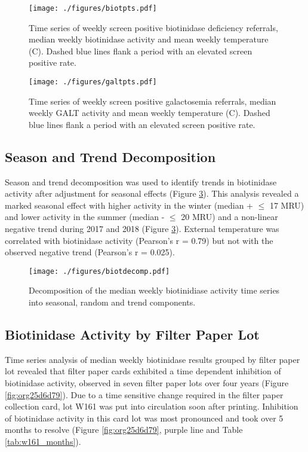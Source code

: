 \documentclass[review]{elsarticle}
\begin{document}
\begin{figure}[htbp]
\centering
\texttt{[image: ./figures/biotpts.pdf]}
\caption{\label{fig:org66b7778}Time series of weekly screen positive biotinidase deficiency referrals, median weekly biotinidase activity and mean weekly temperature (\degree{}C). Dashed blue lines flank a period with an elevated screen positive rate.}
\end{figure}

\begin{figure}[htbp]
\centering
\texttt{[image: ./figures/galtpts.pdf]}
\caption{\label{fig:orgc7ba5f8}Time series of weekly screen positive galactosemia referrals, median weekly GALT activity and mean weekly temperature (\degree{}C).  Dashed blue lines flank a period with an elevated screen positive rate.}
\end{figure}

\clearpage

\subsection*{Season and Trend Decomposition}
\label{sec:org340db58}
Season and trend decomposition was used to identify trends in
biotinidase activity after adjustment for seasonal effects (Figure
\ref{fig:orgc3a63e4}). This analysis revealed a marked seasonal effect with
higher activity in the winter (median + \(\le\) 17 MRU) and lower activity
in the summer (median - \(\le\) 20 MRU) and a non-linear negative trend
during 2017 and 2018 (Figure \ref{fig:orgc3a63e4}). External temperature was
correlated with biotinidase activity (Pearson's r = 0.79) but not with
the observed negative trend (Pearson's r = 0.025).

\begin{figure}[htbp]
\centering
\texttt{[image: ./figures/biotdecomp.pdf]}
\caption{\label{fig:orgc3a63e4}Decomposition of the median weekly biotinidiase activity time series into seasonal, random and trend components.}
\end{figure}

\clearpage

\subsection*{Biotinidase Activity by Filter Paper Lot}
\label{sec:org8ebd58a}
Time series analysis of median weekly biotinidase results grouped by
filter paper lot revealed that filter paper cards exhibited a time
dependent inhibition of biotinidase activity, observed in seven filter
paper lots over four years (Figure \ref{fig:org25d6d79}). Due to a time sensitive
change required in the filter paper collection card, lot W161 was put into
circulation soon after printing. Inhibition of biotinidase activity in
this card lot was most pronounced and took over 5 months to resolve
(Figure \ref{fig:org25d6d79}, purple line and Table \ref{tab:w161_months}).
\end{document}
